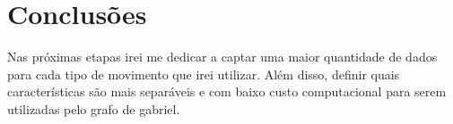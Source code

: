 \section{Conclusões}


Nas próximas etapas irei me dedicar a captar uma maior quantidade de dados para cada tipo de movimento que irei utilizar. Além disso,
definir quais características são mais separáveis e com baixo custo computacional para serem utilizadas pelo grafo de gabriel.
